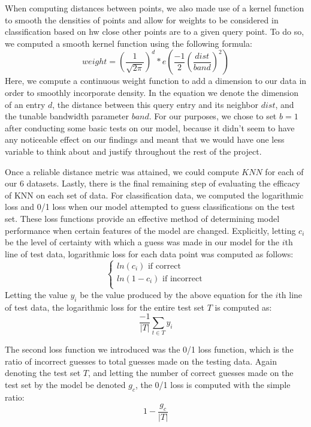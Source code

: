\documentclass[twoside,11pt]{article}
\begin{document}
 When computing distances between points, we also made use of a kernel function to smooth the densities of points and allow for weights to be
 considered in classification based on hw close other points are to a given query point. To do so, we computed a smooth kernel function using the following
 formula:
 \begin{equation}
 weight = (\frac{1}{\sqrt{2\pi}})^d * e(\frac{-1}{2} (\frac{dist}{band})^2)
 \end{equation}
 Here, we compute a continuous weight function to add a dimension to our data in order to smoothly incorporate density. In the equation we denote the dimension
 of an entry $d$, the distance between this query entry and its neighbor $dist$, and the tunable bandwidth parameter $band$. For our purposes, we chose to set
 $b=1$ after conducting some basic tests on our model, because it didn't seem to have any noticeable effect on our findings and meant that we would have one less
 variable to think about and justify throughout the rest of the project.
 
 Once a reliable distance metric was attained, we could compute $KNN$ for each of our 6 datasets. Lastly, there is the final remaining step of evaluating 
 the efficacy of KNN on each set of data. For classification data, we computed the logarithmic loss and 0/1 loss when our model attempted to guess
 classifications on the test set. 
These loss functions provide an effective method of determining model performance when certain features of the model are changed. Explicitly, letting $c_i$ be the level 
of certainty with which a guess was made in our model for the $i$th line of test data, logarithmic loss for each data point was computed as follows:
\[\begin{cases}
	ln(c_i) \text{ if correct}\\
	ln(1-c_i) \text{ if incorrect}\\
\end{cases}\]
Letting the value $y_i$ be the value produced by the above equation for the $i$th line of test data, the logarithmic loss  for the entire test set $T$ is computed
as:
\begin{equation}
\frac{-1}{|T|}\sum_{t \in T}^{ } y_i
\end{equation}

The second loss function we introduced was the 0/1 loss function, which is the ratio of incorrect guesses to total guesses made on the testing data.
Again denoting the test set $T$, and letting the number of correct guesses made on the test set by the model be denoted $g_c$, the 0/1 loss is computed with the simple ratio:
\begin{equation}
	1 - \frac{g_c}{|T|}
\end{equation}
\end{document}
